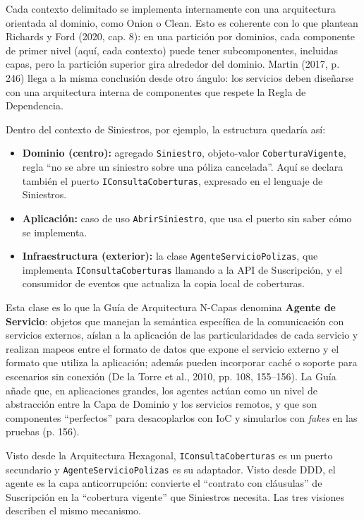 \documentclass[11pt,a4paper]{article}
\begin{document}
Cada contexto delimitado se implementa internamente con una arquitectura orientada al dominio, como Onion o Clean. Esto es coherente con lo que plantean Richards y Ford (2020, cap. 8): en una partición por dominios, cada componente de primer nivel (aquí, cada contexto) puede tener subcomponentes, incluidas capas, pero la partición superior gira alrededor del dominio. Martin (2017, p. 246) llega a la misma conclusión desde otro ángulo: los servicios deben diseñarse con una arquitectura interna de componentes que respete la Regla de Dependencia.

Dentro del contexto de Siniestros, por ejemplo, la estructura quedaría así:

\begin{itemize}[leftmargin=1.5em]
  \item \textbf{Dominio (centro):} agregado \texttt{Siniestro}, objeto-valor \texttt{CoberturaVigente}, regla ``no se abre un siniestro sobre una póliza cancelada''. Aquí se declara también el puerto \texttt{IConsultaCoberturas}, expresado en el lenguaje de Siniestros.
  \item \textbf{Aplicación:} caso de uso \texttt{AbrirSiniestro}, que usa el puerto sin saber cómo se implementa.
  \item \textbf{Infraestructura (exterior):} la clase \texttt{AgenteServicioPolizas}, que implementa \texttt{IConsultaCoberturas} llamando a la API de Suscripción, y el consumidor de eventos que actualiza la copia local de coberturas.
\end{itemize}

Esta clase es lo que la Guía de Arquitectura N-Capas denomina \textbf{Agente de Servicio}: objetos que manejan la semántica específica de la comunicación con servicios externos, aíslan a la aplicación de las particularidades de cada servicio y realizan mapeos entre el formato de datos que expone el servicio externo y el formato que utiliza la aplicación; además pueden incorporar caché o soporte para escenarios sin conexión (De la Torre et al., 2010, pp. 108, 155--156). La Guía añade que, en aplicaciones grandes, los agentes actúan como un nivel de abstracción entre la Capa de Dominio y los servicios remotos, y que son componentes ``perfectos'' para desacoplarlos con IoC y simularlos con \emph{fakes} en las pruebas (p. 156).

Visto desde la Arquitectura Hexagonal, \texttt{IConsultaCoberturas} es un puerto secundario y \texttt{AgenteServicioPolizas} es su adaptador. Visto desde DDD, el agente es la capa anticorrupción: convierte el ``contrato con cláusulas'' de Suscripción en la ``cobertura vigente'' que Siniestros necesita. Las tres visiones describen el mismo mecanismo.
\end{document}

